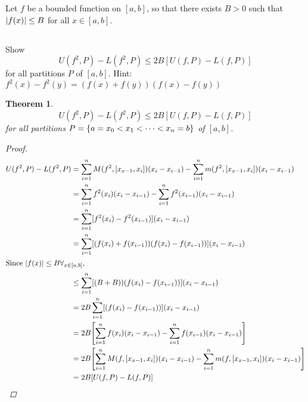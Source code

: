 \documentclass[]{article}
\newtheorem{theorem}{Theorem}
\begin{document}
\newpage
\section{}
Let $f$ be a bounded function on $[a,b]$, so that there exists $B>0$ such that $\abs{f(x)}\leq B$ for all $x\in [a,b]$.

\subsection{}
Show\[
    U(f^2,P) - L(f^2,P) \leq 2 B[U(f,P) - L(f,P)]
\] for all partitions $P$ of $[a,b]$.
Hint: $f^2(x) - f^2(y) = (f(x) + f(y)) (f(x)-f(y))$

\begin{theorem}\label{thm:pblm2a}
    \[
        U(f^2,P) - L(f^2,P) \leq 2 B[U(f,P) - L(f,P)]
    \] for all partitions $P=\qty{a=x_0<x_1<\dots<x_n=b}$ of $[a,b]$.
    \begin{proof}
        \begin{align*}
            U(f^2,P) - L(f^2,P) 
                &= \sum_{i=1}^n M(f^2,[x_{x-1},x_{i}])(x_{i}-x_{i-1}) 
                    - \sum_{i=1}^n m(f^2,[x_{x-1},x_{i}])(x_{i}-x_{i-1})\\
                &= \sum_{i=1}^n f^2(x_i) (x_{i}-x_{i-1}) 
                    - \sum_{i=1}^n f^2(x_{i-1}) (x_{i}-x_{i-1})\\
                &= \sum_{i=1}^n [f^2(x_i) - f^2(x_{i-1})] (x_{i}-x_{i-1})\\
                &= \sum_{i=1}^n [(f(x_i) + f(x_{i-1})) (f(x_{i})-f(x_{i-1}))] (x_{i}-x_{i-1})\\
    \intertext{Since $\abs{f(x)}\leq B \forall_{x\in [a,b]}$,}
                &\leq\sum_{i=1}^n [(B + B)) (f(x_{i})-f(x_{i-1}))] (x_{i}-x_{i-1})\\
                &=2B\sum_{i=1}^n [(f(x_{i})-f(x_{i-1}))] (x_{i}-x_{i-1})\\
                &=2B\qty[
                    \sum_{i=1}^n f(x_i) (x_{i}-x_{i-1}) 
                        - \sum_{i=1}^n f(x_{i-1}) (x_{i}-x_{i-1})
                ]\\
                &= 2B\qty[
                    \sum_{i=1}^n M(f,[x_{x-1},x_{i}])(x_{i}-x_{i-1}) 
                        - \sum_{i=1}^n m(f,[x_{x-1},x_{i}])(x_{i}-x_{i-1})
                ]\\
                &= 2 B[U(f,P) - L(f,P)]
        \end{align*}
    \end{proof}
\end{theorem}
\end{document}
